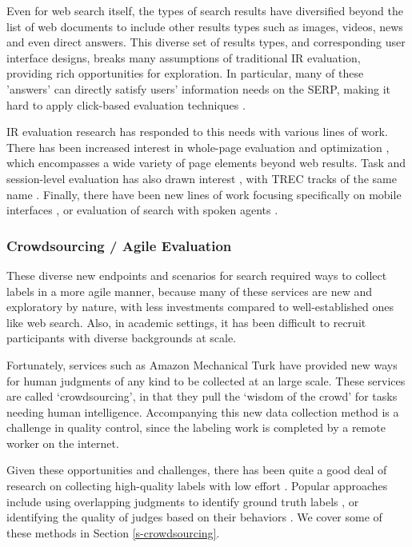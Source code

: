 Even for web search itself, the types of search results have diversified beyond the list of web documents to include other results types such as images, videos, news and even direct answers. This diverse set of results types, and corresponding user interface designs, breaks many assumptions of traditional IR evaluation, providing rich opportunities for exploration. In particular, many of these 'answers' can directly satisfy users' information needs on the SERP, making it hard to apply click-based evaluation techniques \citep{Li2009GA,diriye2012leaving}.

IR evaluation research has responded to this needs with various lines of work. There has been increased interest in whole-page evaluation and optimization \citep{Zhou:2012}, which encompasses a wide variety of page elements beyond web results. %
%
Task and session-level evaluation has also drawn interest \citep{KanoulasCCS11, CarteretteKHC14}, with TREC tracks of the same name \citep{carterette2014overview}. Finally, there have been new lines of work focusing specifically on mobile interfaces \citep{VermaYC16}, or evaluation of search with spoken agents \citep{Kiseleva:2016}.

\subsubsection{Crowdsourcing / Agile Evaluation}

These diverse new endpoints and scenarios for search required ways to collect labels in a more agile manner, because many of these services are new and exploratory by nature, with less investments compared to well-established ones like web search. Also, in academic settings, it has been difficult to recruit participants with diverse backgrounds at scale.

Fortunately, services such as Amazon Mechanical Turk have provided new ways for human judgments of any kind to be collected at an large scale. These services are called `crowdsourcing', in that they pull the `wisdom of the crowd' for tasks needing human intelligence. Accompanying this new data collection method is a challenge in quality control, since the labeling work is completed by a remote worker on the internet.

Given these opportunities and challenges, there has been quite a good deal of research on collecting high-quality labels with low effort \citep{Alonso2012}. Popular approaches include using overlapping judgments to identify ground truth labels \citep{Venanzi:2014}, or identifying the quality of judges based on their behaviors \citep{Kazai:2016}. We cover some of these methods in Section \ref{s-crowdsourcing}.

